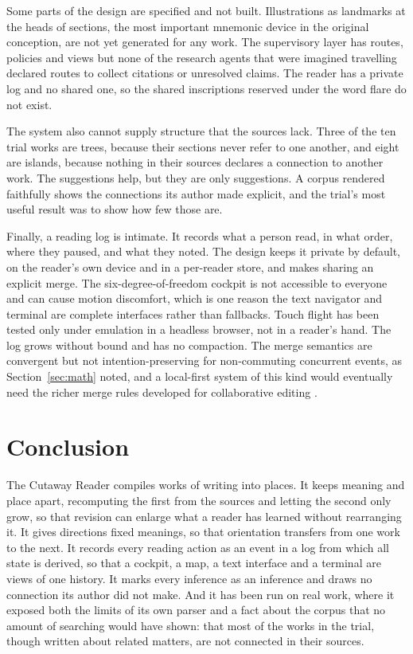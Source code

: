 \documentclass[11pt]{article}
\theoremstyle{remark}
\begin{document}
Some parts of the design are specified and not built. Illustrations as landmarks at the heads of sections, the most important mnemonic device in the original conception, are not yet generated for any work. The supervisory layer has routes, policies and views but none of the research agents that were imagined travelling declared routes to collect citations or unresolved claims. The reader has a private log and no shared one, so the shared inscriptions reserved under the word flare do not exist.

The system also cannot supply structure that the sources lack. Three of the ten trial works are trees, because their sections never refer to one another, and eight are islands, because nothing in their sources declares a connection to another work. The suggestions help, but they are only suggestions. A corpus rendered faithfully shows the connections its author made explicit, and the trial's most useful result was to show how few those are.

Finally, a reading log is intimate. It records what a person read, in what order, where they paused, and what they noted. The design keeps it private by default, on the reader's own device and in a per-reader store, and makes sharing an explicit merge. The six-degree-of-freedom cockpit is not accessible to everyone and can cause motion discomfort, which is one reason the text navigator and terminal are complete interfaces rather than fallbacks. Touch flight has been tested only under emulation in a headless browser, not in a reader's hand. The log grows without bound and has no compaction. The merge semantics are convergent but not intention-preserving for non-commuting concurrent events, as Section~\ref{sec:math} noted, and a local-first system of this kind would eventually need the richer merge rules developed for collaborative editing \cite{kleppmann2019}.

\section{Conclusion}
\label{sec:conclusion}

The Cutaway Reader compiles works of writing into places. It keeps meaning and place apart, recomputing the first from the sources and letting the second only grow, so that revision can enlarge what a reader has learned without rearranging it. It gives directions fixed meanings, so that orientation transfers from one work to the next. It records every reading action as an event in a log from which all state is derived, so that a cockpit, a map, a text interface and a terminal are views of one history. It marks every inference as an inference and draws no connection its author did not make. And it has been run on real work, where it exposed both the limits of its own parser and a fact about the corpus that no amount of searching would have shown: that most of the works in the trial, though written about related matters, are not connected in their sources.
\end{document}
